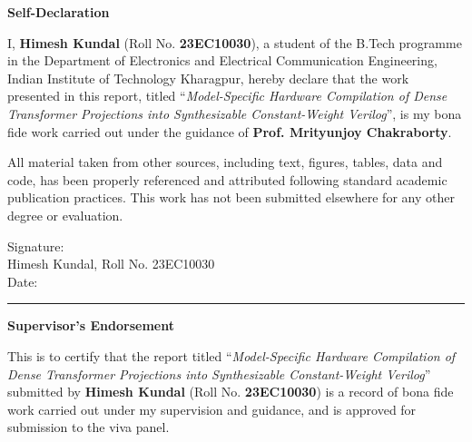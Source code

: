 \documentclass[11pt,a4paper]{article}
\begin{document}
\thispagestyle{empty}

\begin{center}
    {\Large \textbf{Self-Declaration}}
\end{center}
\vspace{1.5em}

\noindent I, \textbf{Himesh Kundal} (Roll No. \textbf{23EC10030}), a student of the B.Tech programme in the Department of Electronics and Electrical Communication Engineering, Indian Institute of Technology Kharagpur, hereby declare that the work presented in this report, titled ``\textit{Model-Specific Hardware Compilation of Dense Transformer Projections into Synthesizable Constant-Weight Verilog}'', is my bona fide work carried out under the guidance of \textbf{Prof. Mrityunjoy Chakraborty}.

\vspace{1em}
\noindent All material taken from other sources, including text, figures, tables, data and code, has been properly referenced and attributed following standard academic publication practices. This work has not been submitted elsewhere for any other degree or evaluation.

\vspace{3em}
\begin{flushright}
\begin{minipage}{0.55\textwidth}
Signature: \underline{\hspace{4.5cm}}\\[1.2em]
Himesh Kundal, Roll No. 23EC10030\\[0.8em]
Date: \underline{\hspace{3.5cm}}
\end{minipage}
\end{flushright}

\vspace{2.5em}
\hrule
\vspace{2.5em}

\begin{center}
    {\Large \textbf{Supervisor's Endorsement}}
\end{center}
\vspace{1.5em}

\noindent This is to certify that the report titled ``\textit{Model-Specific Hardware Compilation of Dense Transformer Projections into Synthesizable Constant-Weight Verilog}'' submitted by \textbf{Himesh Kundal} (Roll No. \textbf{23EC10030}) is a record of bona fide work carried out under my supervision and guidance, and is approved for submission to the viva panel.
\end{document}
